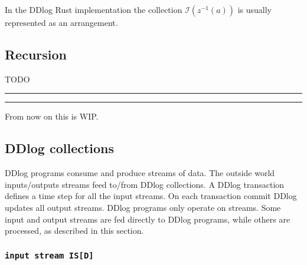 \documentclass[10pt]{article}
\newcommand{\code}[1]{\texttt{#1}}
\newcommand{\zm}{\ensuremath{z^{-1}}} %
\newcommand{\I}{\mathcal{I}}  %
\newcommand{\id}{\ensuremath{\mathit{id}}} %
\begin{document}
In the DDlog Rust implementation the collection $\I(\zm(a))$ is
usually represented as an arrangement.

\subsection{Recursion}

TODO

\hrule
\hrule
\pagebreak

From now on this is WIP.

\begin{comment}
\subsection{DDlog types}

\[\frac{\code{A}: T, \code{B}: S}{\code{(A,B)}: T \times S}\]
\[\frac{\code{A}: T, \code{B}: S}{\code{function(x:A):B}: A \rightarrow B}\]
\[\frac{\code{T1}: T_1, \code{T2}: T_2}{\code{T1 | T2} : T_1 \oplus T_2}\]
\[\frac{\code{T1}: T_1, \code{T2}: T_2}{\code{Constructor\{f1: T1, f2:
    T2\}} : \string \rightarrow T_1 \oplus T_2}\]
\end{comment}

\subsection{DDlog collections}

DDlog programs consume and produce streams of data.  The outside world
inputs/outputs streams feed to/from DDlog collections.  A DDlog
transaction defines a time step for all the input streams.  On each
transaction commit DDlog updates all output streams.  DDlog programs
only operate on streams.  Some input and output streams are fed
directly to DDlog programs, while others are processed, as described
in this section.

\subsubsection{\code{input stream IS[D]}}

\end{document}
